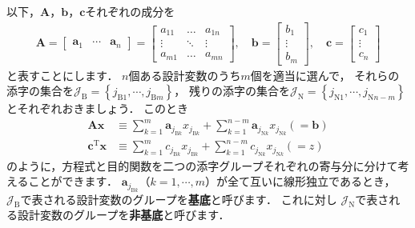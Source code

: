 ﻿\documentclass[a4paper]{jsarticle}
\begin{document}
以下，$\boldsymbol{A}$，$\boldsymbol{b}$，$\boldsymbol{c}$それぞれの成分を
\begin{align*}
\boldsymbol{A}=\begin{bmatrix}
\boldsymbol{a}_{1} & \cdots & \boldsymbol{a}_{n}
\end{bmatrix}=\begin{bmatrix}
a_{11} & \hdots & a_{1n} \\
\vdots & \ddots & \vdots \\
a_{m1} & \hdots & a_{mn}
\end{bmatrix},
\quad
\boldsymbol{b}=\begin{bmatrix}
b_{1} \\ \vdots \\ b_{m}
\end{bmatrix},
\quad
\boldsymbol{c}=\begin{bmatrix}
c_{1} \\ \vdots \\ c_{n}
\end{bmatrix}
\end{align*}
と表すことにします．
$n$個ある設計変数のうち$m$個を適当に選んで，
それらの添字の集合を$\mathcal{J}_{\mathrm{B}}=\left\{j_{\mathrm{B}1},\cdots,j_{\mathrm{B}m}\right\}$，
残りの添字の集合を$\mathcal{J}_{\mathrm{N}}=\left\{j_{\mathrm{N}1},\cdots,j_{\mathrm{N}n-m}\right\}$とそれぞれおきましょう．
このとき
\begin{align}
\boldsymbol{A}\boldsymbol{x}&\equiv
 \sum_{k=1}^{m}\boldsymbol{a}_{j_{\mathrm{B}k}}x_{j_{\mathrm{B}k}}
+\sum_{k=1}^{n-m}\boldsymbol{a}_{j_{\mathrm{N}k}}x_{j_{\mathrm{N}k}}
\left(=\boldsymbol{b}\right)
\label{eq:lp_eq_pivot}
\\
\boldsymbol{c}^{\mathrm{T}}\boldsymbol{x}&\equiv
 \sum_{k=1}^{m}c_{j_{\mathrm{B}k}}x_{j_{\mathrm{B}k}}
+\sum_{k=1}^{n-m}c_{j_{\mathrm{N}k}}x_{j_{\mathrm{N}k}}
\left(=z\right)
\label{eq:lp_eq_cost}
\end{align}
のように，方程式と目的関数を二つの添字グループそれぞれの寄与分に分けて考えることができます．
$\boldsymbol{a}_{j_{\mathrm{B}k}}$（$k=1,\cdots,m$）が全て互いに線形独立であるとき，
$\mathcal{J}_{\mathrm{B}}$で表される設計変数のグループを{\bf 基底}と呼びます．
これに対し
$\mathcal{J}_{\mathrm{N}}$で表される設計変数のグループを{\bf 非基底}と呼びます．
\end{document}
